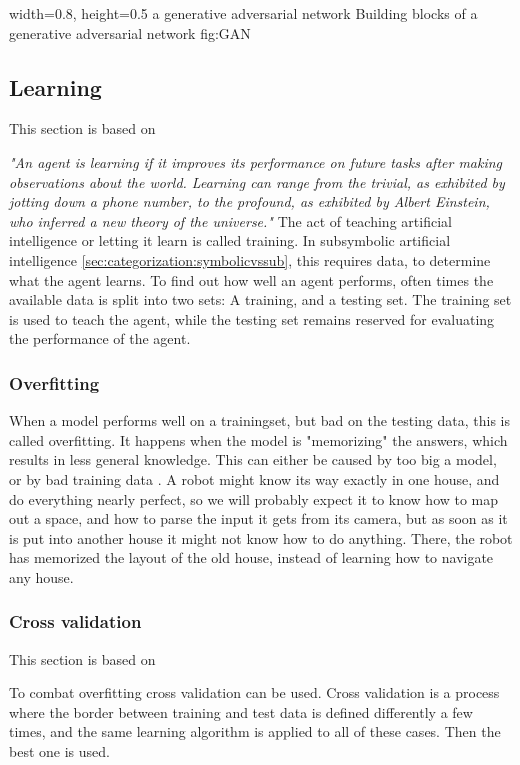    {width=0.8\textwidth, height=0.5\textheight} %
    {a generative adversarial network}   %
    {Building blocks of a generative adversarial network}   %
    {fig:GAN}    %

\subsection{Learning} 
This section is based on \cite[p. 693f]{MA}

\textit{"An agent is learning if it improves its performance on future tasks after making observations
about the world. Learning can range from the trivial, as exhibited by jotting down a phone
number, to the profound, as exhibited by Albert Einstein, who inferred a new theory of the
universe."} \cite[p. 693]{MA}
The act of teaching artificial intelligence or letting it learn is called training. In subsymbolic artificial intelligence \autoref{sec:categorization:symbolicvssub}, this requires data, to determine what the agent learns. To find out how well an agent performs, often times the available data is split into two sets: A training, and a testing set. The training set is used to teach the agent, while the testing set remains reserved for evaluating the performance of the agent.

\subsubsection{Overfitting}
\label{sec:overfitting}
When a model performs well on a trainingset, but bad on the testing data, this is called overfitting. It happens when the model is "memorizing" the answers, which results in less general knowledge. This can either be caused by too big a model, or by bad training data \cite{overfit}. A robot might know its way exactly in one house, and do everything nearly perfect, so we will probably expect it to know how to map out a space, and how to parse the input it gets from its camera, but as soon as it is put into another house it might not know how to do anything. There, the robot has memorized the layout of the old house, instead of learning how to navigate any house.

\subsubsection{Cross validation}
This section is based on \cite[p. 709f]{MA}

To combat overfitting cross validation can be used. Cross validation is a process where the border between training and test data is defined differently a few times, and the same learning algorithm is applied to all of these cases. Then the best one is used.